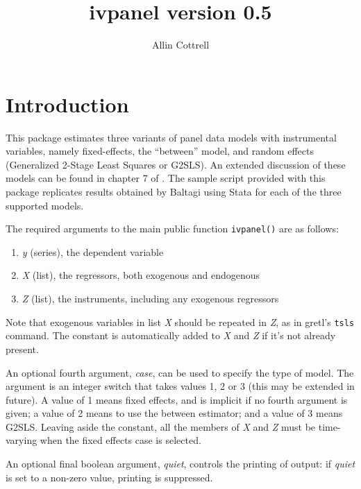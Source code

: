 \documentclass{article}
\begin{document}
\setlength{\parindent}{0pt}
\setlength{\parskip}{1ex}

\newcommand{\argname}[1]{\textsl{#1}}

\title{ivpanel version 0.5}
\author{Allin Cottrell}
\maketitle

\section{Introduction}

This package estimates three variants of panel data models with
instrumental variables, namely fixed-effects, the ``between'' model,
and random effects (Generalized 2-Stage Least Squares or G2SLS). An
extended discussion of these models can be found in chapter 7 of
\cite{baltagi05}. The sample script provided with this package
replicates results obtained by Baltagi using \textsf{Stata} for
each of the three supported models.

The required arguments to the main public function \texttt{ivpanel()}
are as follows:

\begin{enumerate}
\item \argname{y} (series), the dependent variable
\item \argname{X} (list), the regressors, both exogenous and endogenous
\item \argname{Z} (list), the instruments, including any exogenous
  regressors
\end{enumerate}

Note that exogenous variables in list \argname{X} should be repeated
in \argname{Z}, as in gretl's \texttt{tsls} command. The constant is
automatically added to \argname{X} and \argname{Z} if it's not already
present.

An optional fourth argument, \argname{case}, can be used to specify
the type of model. The argument is an integer switch that takes values
1, 2 or 3 (this may be extended in future).  A value of 1 means fixed
effects, and is implicit if no fourth argument is given; a value of 2
means to use the between estimator; and a value of 3 means G2SLS.
Leaving aside the constant, all the members of \argname{X} and
\argname{Z} must be time-varying when the fixed effects case is
selected.

An optional final boolean argument, \argname{quiet}, controls the
printing of output: if \argname{quiet} is set to a non-zero value,
printing is suppressed.
\end{document}
